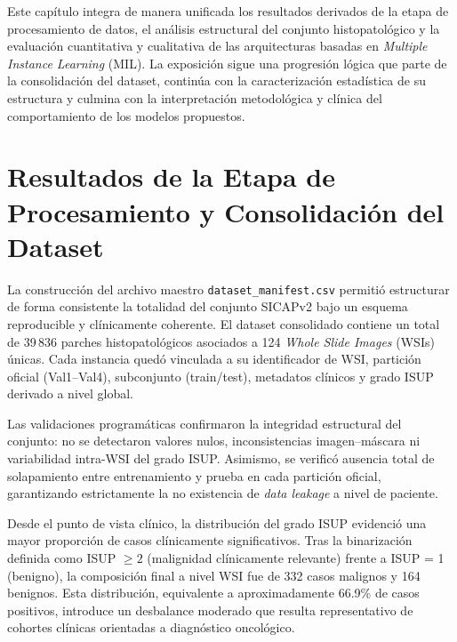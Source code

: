 
Este capítulo integra de manera unificada los resultados derivados de la etapa de procesamiento de datos, el análisis estructural del conjunto histopatológico y la evaluación cuantitativa y cualitativa de las arquitecturas basadas en \textit{Multiple Instance Learning} (MIL). La exposición sigue una progresión lógica que parte de la consolidación del dataset, continúa con la caracterización estadística de su estructura y culmina con la interpretación metodológica y clínica del comportamiento de los modelos propuestos.

\section{Resultados de la Etapa de Procesamiento y Consolidación del Dataset}
La construcción del archivo maestro \texttt{dataset\_manifest.csv} permitió estructurar de forma consistente la totalidad del conjunto SICAPv2 bajo un esquema reproducible y clínicamente coherente. El dataset consolidado contiene un total de 39\,836 parches histopatológicos asociados a 124 \textit{Whole Slide Images} (WSIs) únicas. Cada instancia quedó vinculada a su identificador de WSI, partición oficial (Val1–Val4), subconjunto (train/test), metadatos clínicos y grado ISUP derivado a nivel global.\newline

Las validaciones programáticas confirmaron la integridad estructural del conjunto: no se detectaron valores nulos, inconsistencias imagen–máscara ni variabilidad intra-WSI del grado ISUP. Asimismo, se verificó ausencia total de solapamiento entre entrenamiento y prueba en cada partición oficial, garantizando estrictamente la no existencia de \textit{data leakage} a nivel de paciente.\newline

Desde el punto de vista clínico, la distribución del grado ISUP evidenció una mayor proporción de casos clínicamente significativos. Tras la binarización definida como ISUP $\geq 2$ (malignidad clínicamente relevante) frente a ISUP = 1 (benigno), la composición final a nivel WSI fue de 332 casos malignos y 164 benignos. Esta distribución, equivalente a aproximadamente 66.9\% de casos positivos, introduce un desbalance moderado que resulta representativo de cohortes clínicas orientadas a diagnóstico oncológico.

